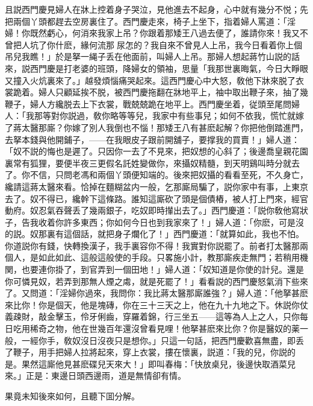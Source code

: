 且説西門慶見婦人在牀上控着身子哭泣，見他進去不起身，心中就有幾分不悦；先把兩個丫頭都趕去空房裏住了。西門慶走來，椅子上坐下，指着婦人罵道：「淫婦！你既然虧心，何消來我家上吊？你跟着那矮王八過去便了，誰請你來！我又不曾把人坑了你什麽，緣何流那𣭈尿怎的？我自來不曾見人上吊，我今日看着你上個吊兒我瞧！」於是拏一䋲子丢在他面前，叫婦人上吊。那婦人想起蔣竹山説的話來，説西門慶是打老婆的班頭，降婦女的領袖，思量「我那世裏晦氣，今日大睜眼又撞入火炕裏來了。」越發煩惱痛哭起來。這西門慶心中大怒，敎他下牀來脱了衣裳跪着。婦人只顧延挨不脱，被西門慶拖翻在牀地平上，袖中取出鞭子來，抽了幾鞭子，婦人方纔脱去上下衣裳，戰兢兢跪在地平上。西門慶坐着，従頭至尾問婦人：「我那等對你説過，敎你略等等兒，我家中有些事兒；如何不依我，慌忙就嫁了蔣太醫那廝？你嫁了別人我倒也不惱！那矮王八有甚麽起解？你把他倒踏進門，去拏本錢與他開鋪子，——在我眼皮子跟前開舖子，要撑我的買賣！」婦人道：「奴不説的悔也是遲了。只因你一去了不見來，把奴想的心斜了；後邊喬皇親花園裏常有狐狸，要便半夜三更假名託姓變做你，來攝奴精髓，到天明鷄叫時分就去了。你不信，只問老馮和兩個丫頭便知端的。後來把奴攝的看看至死，不久身亡，纔請這蔣太醫來看。恰掉在麵糊盆内一般，乞那廝局騙了，説你家中有事，上東京去了。奴不得已，纔幹下這條路。誰知這廝砍了頭是個債樁，被人打上門來，經官動府。奴忍氣吞聲丢了幾兩銀子，吃奴即時攆出去了。」西門慶道：「説你敎他寫狀子，告我收着你許多東西；你如何今日也到我家來了！」婦人道：「你麽，可是沒的説。奴那裏有這個話，就把身子爛化了！」西門慶道：「就算如此，我也不怕。你道説你有錢，快轉換漢子，我手裏容你不得！我實對你説罷了。前者打太醫那兩個人，是如此如此、這般這般使的手段。只畧施小計，教那廝疾走無門；若稍用機関，也要連你掛了，到官弄到一個田地！」婦人道：「奴知道是你使的計兒。還是你可憐見奴，若弄到那無人煙之䖏，就是死罷了！」看看説的西門慶怒氣消下些來了。又問道：「淫婦你過來，我問你：我比蔣太醫那廝誰強？」婦人道：「他拏甚麽來比你！你是個天，他是塊磚，你在三十三天之上，他在九十九地之下。休説你仗義疎財，敲金擊玉，伶牙俐齒，穿羅着錦，行三坐五——這等為人上之人，只你每日吃用稀奇之物，他在世幾百年還沒曾看見哩！他拏甚麽來比你？你是醫奴的薬一般，一經你手，敎奴沒日沒夜只是想你。」只這一句話，把西門慶歡喜無盡，即丢了鞭子，用手把婦人拉將起來，穿上衣裳，摟在懷裏，説道：「我的兒，你説的是。果然這廝他見甚麽碟兒天來大！」即叫春梅：「快放桌兒，後邊快取酒菜兒來。」正是：東邊日頭西邊雨，道是無情卻有情。

果竟未知後來如何，且聽下囬分解。

